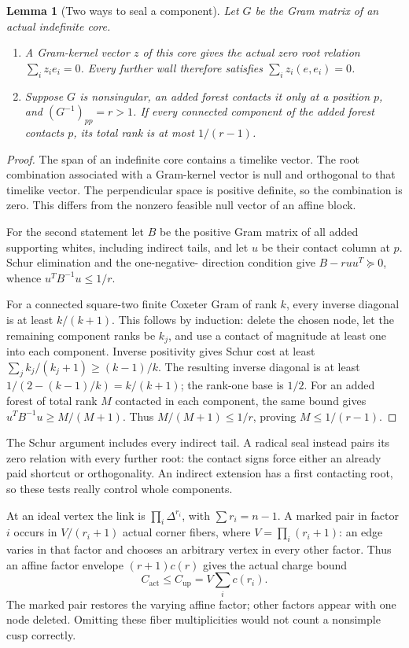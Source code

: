 \documentclass[11pt]{article}
\newtheorem{lemma}[theorem]{Lemma}
\theoremstyle{remark}\newtheorem{remark}[theorem]{Remark}
\numberwithin{equation}{section}
\begin{document}
\begin{lemma}[Two ways to seal a component]\label{fv:lem:seals}
Let $G$ be the Gram matrix of an actual indefinite core.
\begin{enumerate}
\item A Gram-kernel vector $z$ of this core gives the actual zero
root relation $\sum_i z_i e_i=0$. Every further wall therefore
satisfies $\sum_i z_i(e,e_i)=0$.
\item Suppose $G$ is nonsingular, an added forest contacts it only
at a position $p$, and $(G^{-1})_{pp}=r>1$. If every connected
component of the added forest contacts $p$, its total rank is at
most $1/(r-1)$.
\end{enumerate}
\end{lemma}
\begin{proof}
The span of an indefinite core contains a timelike vector. The root
combination associated with a Gram-kernel vector is null and
orthogonal to that timelike vector. The perpendicular space is
positive definite, so the combination is zero. This differs from
the nonzero feasible null vector of an affine block.

For the second statement let $B$ be the positive Gram matrix of all
added supporting whites, including indirect tails, and let $u$ be
their contact column at $p$. Schur elimination and the one-negative-
direction condition give $B-r uu^T\succeq0$, whence
 $u^TB^{-1}u\le1/r$.

For a connected square-two finite Coxeter Gram of rank $k$, every
inverse diagonal is at least $k/(k+1)$. This follows by induction:
delete the chosen node, let the remaining component ranks be $k_j$,
and use a contact of magnitude at least one into each component.
Inverse positivity gives Schur cost at least
 $\sum_j k_j/(k_j+1)\ge(k-1)/k$. The resulting inverse diagonal
is at least $1/(2-(k-1)/k)=k/(k+1)$; the rank-one base is $1/2$.
For an added forest of total rank $M$ contacted in each component,
the same bound gives $u^TB^{-1}u\ge M/(M+1)$.
Thus $M/(M+1)\le1/r$, proving $M\le1/(r-1)$.
\end{proof}

The Schur argument includes every indirect tail. A radical seal
instead pairs its zero relation with every further root: the
contact signs force either an already paid shortcut or orthogonality.
An indirect extension has a first contacting root, so these tests
really control whole components.

At an ideal vertex the link is $\prod_i\Delta^{r_i}$, with
$\sum r_i=n-1$. A marked pair in factor $i$ occurs in
$V/(r_i+1)$ actual corner fibers, where $V=\prod_i(r_i+1)$:
an edge varies in that factor and chooses an arbitrary vertex
in every other factor. Thus an affine factor envelope $(r+1)c(r)$
gives the actual charge bound
\begin{equation}\label{eq:envelope}
 C_{\mathrm{act}}\le C_{\mathrm{up}}=V\sum_i c(r_i).
\end{equation}
The marked pair restores the varying affine factor; other factors
appear with one node deleted. Omitting these fiber multiplicities
would not count a nonsimple cusp correctly.
\end{document}
